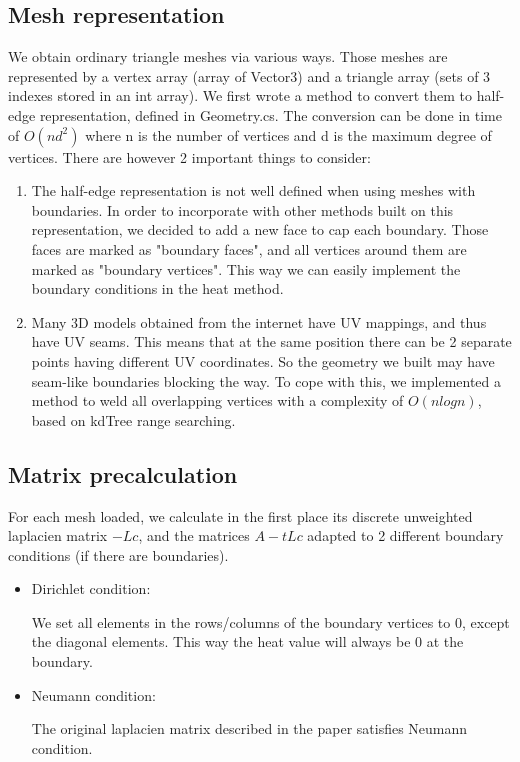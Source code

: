 \documentclass[a4paper,12pt,twoside]{article}
\begin{document}
\subsection{Mesh representation}

We obtain ordinary triangle meshes via various ways. Those meshes are represented by a vertex array (array of Vector3) and a triangle array (sets of 3 indexes stored in an int array). We first wrote a method to convert them to half-edge representation, defined in Geometry.cs. The conversion can be done in time of $O(nd^2)$ where n is the number of vertices and d is the maximum degree of vertices. There are however 2 important things to consider:

\begin{enumerate}

\item
The half-edge representation is not well defined when using meshes with boundaries. In order to incorporate with other methods built on this representation, we decided to add a new face to cap each boundary. Those faces are marked as "boundary faces", and all vertices around them are marked as "boundary vertices". This way we can easily implement the boundary conditions in the heat method.

\item
Many 3D models obtained from the internet have UV mappings, and thus have UV seams. This means that at the same position there can be 2 separate points having different UV coordinates. So the geometry we built may have seam-like boundaries blocking the way. To cope with this, we implemented a method to weld all overlapping vertices with a complexity of $O(nlogn)$, based on kdTree range searching.

\end{enumerate}

\subsection{Matrix precalculation}

For each mesh loaded, we calculate in the first place its discrete unweighted laplacien matrix $-Lc$, and the matrices $A-tLc$ adapted to 2 different boundary conditions (if there are boundaries).

\begin{itemize}
\item
Dirichlet condition:

We set all elements in the rows/columns of the boundary vertices to 0, except the diagonal elements. This way the heat value will always be 0 at the boundary.

\item
Neumann condition:

The original laplacien matrix described in the paper satisfies Neumann condition.
\end{itemize}
\end{document}
